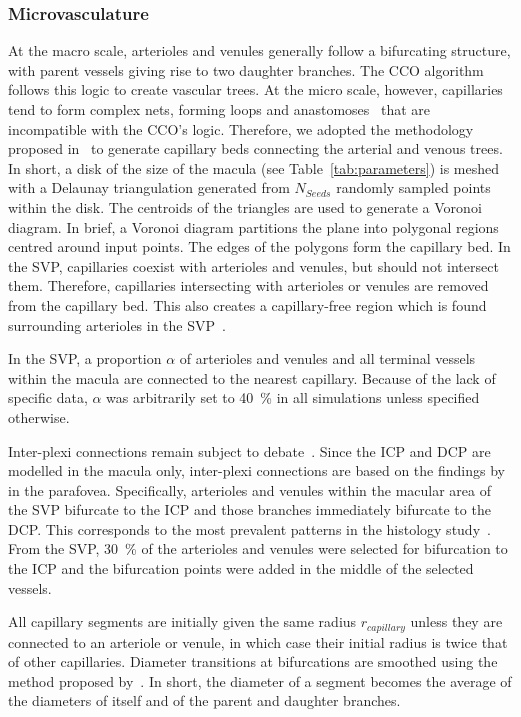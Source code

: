 \documentclass[11pt,]{article}
\begin{document}
\subsubsection{Microvasculature}\label{sec:microvasculature}
At the macro scale, arterioles and venules generally follow a bifurcating
structure, with parent vessels giving rise to two daughter
branches. The CCO algorithm follows this logic to create vascular
trees.  At the micro scale, however, capillaries tend to form complex
nets, forming loops and anastomoses~\cite{An2020} that are
incompatible with the CCO’s logic.
Therefore, we adopted the methodology proposed in~\cite{Linninger2013} to generate capillary beds connecting
the arterial and venous trees.
In short, a disk of the size of the macula (see Table~\ref{tab:parameters}) is meshed with a Delaunay
triangulation generated from $N_{Seeds}$ randomly sampled points
within the disk.
The centroids of the triangles are used to generate a Voronoi diagram.
In brief, a Voronoi diagram partitions the plane into polygonal regions centred around input points. 
The edges of the polygons form the capillary bed.
In the SVP, capillaries coexist with arterioles and venules, but should not intersect them.
Therefore, capillaries intersecting with arterioles or venules are removed from the capillary bed.
This also creates a capillary-free region which is found surrounding arterioles in the SVP~\cite{An2020}.

In the SVP, a proportion $\alpha$ of arterioles and venules and all terminal vessels within the macula are connected to the nearest capillary. Because of the lack of specific data, $\alpha$ was arbitrarily set to \SI{40}{\percent} in all simulations unless specified otherwise.

Inter-plexi connections remain subject to debate~\cite{An2020,Chiaravalli2022,Campbell2017}.
Since the ICP and DCP are modelled in the macula only, inter-plexi connections are based on the findings by~\cite{An2020} in the parafovea.
Specifically, arterioles and venules within the macular area of the SVP bifurcate to the ICP and those branches immediately bifurcate to the DCP.
This corresponds to the most prevalent patterns in the histology study~\cite{An2020}.
From the SVP, \SI{30}{\percent} of the arterioles and venules were selected for bifurcation to the ICP and the bifurcation points were added in the middle of the selected vessels.

All capillary segments are initially given the same radius $r_{capillary}$ unless they are connected to an arteriole or venule, in which case their initial radius is twice that of other capillaries.
Diameter transitions at bifurcations are smoothed using the method proposed by~\cite{Linninger2013}.
In short, the diameter of a segment becomes the average of the diameters of itself and of the parent and daughter branches.
\end{document}
